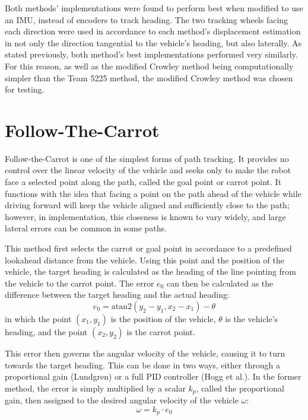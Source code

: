 \documentclass[mla7]{mla}
\begin{document}
\begin{paper}
Both methods' implementations were found to perform best when modified to use an IMU, instead of encoders to track heading. The two tracking wheels facing each direction were used in accordance to each method's displacement estimation in not only the direction tangential to the vehicle's heading, but also laterally. As stated previously, both method's best implementations performed very similarly. For this reason, as well as the modified Crowley method being computationally simpler than the Team 5225 method, the modified Crowley method was chosen for testing.

\section{Follow-The-Carrot}

Follow-the-Carrot is one of the simplest forms of path tracking. It provides no control over the linear velocity of the vehicle and seeks only to make the robot face a selected point along the path, called the goal point or carrot point. It functions with the idea that facing a point on the path ahead of the vehicle while driving forward will keep the vehicle aligned and sufficiently close to the path; however, in implementation, this closeness is known to vary widely, and large lateral errors can be common in some paths.

This method first selects the carrot or goal point in accordance to a predefined lookahead distance from the vehicle. Using this point and the position of the vehicle, the target heading is calculated as the heading of the line pointing from the vehicle to the carrot point. The error $e_0$ can then be calculated as the difference between the target heading and the actual heading: 
\begin{equation}
 e_0 = \text{atan2}(y_2 - y_1,x_2 - x_1) - \theta
\end{equation}
in which the point $(x_1,y_1)$ is the position of the vehicle, $\theta$ is the vehicle's heading, and the point $(x_2,y_2)$ is the carrot point.

This error then governs the angular velocity of the vehicle, causing it to turn towards the target heading. This can be done in two ways, either through a proportional gain (Lundgren) or a full PID controller (Hogg et al.). In the former method, the error is simply multiplied by a scalar $k_p$, called the proportional gain, then assigned to the desired angular velocity of the vehicle $\omega$:
\begin{equation}
\omega = k_p \cdot e_0
\end{equation}


\end{paper}
\end{document}
